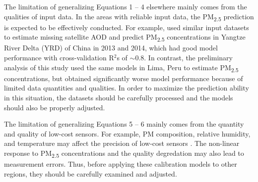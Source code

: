 \documentclass[11pt]{article}
\newcommand{\tsub}{\textsubscript}
\begin{document}
\begin{enumerate*}[{[a)]}]
    \item The limitation of generalizing Equations 1 -- 4 elsewhere mainly comes from the qualities of input data. In the areas with reliable input data, the PM\tsub{2.5} prediction is expected to be effectively conducted. For example, \citet{xiao2017full} used similar input datasets to estimate missing satellite AOD and predict PM\tsub{2.5} concentrations in Yangtze River Delta (YRD) of China in 2013 and 2014, which had good model performance with cross-validation R$^2$s of $\sim$0.8. In contrast, the preliminary analysis of this study used the same models in Lima, Peru to estimate PM\tsub{2.5} concentrations, but obtained significantly worse model performance because of limited data quantities and qualities. In order to maximize the prediction ability in this situation, the datasets should be carefully processed and the models should also be properly adjusted.
    
    The limitation of generalizing Equations 5 -- 6 mainly comes from the quantity and quality of low-cost sensors. For example, PM composition, relative humidity, and temperature may affect the precision of low-cost sensors \citep{carvlin2017development, broday2017wireless, castell2017can}. The non-linear response to PM\tsub{2.5} concentrations \citep{kelly2017ambient} and the quality degredation \citep{broday2017wireless} may also lead to measurement errors. Thus, before applying these calibration models to other regions, they should be carefully examined and adjusted. 
\end{enumerate*}
\end{document}
